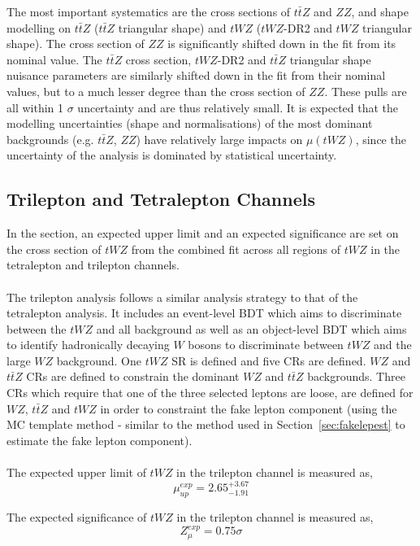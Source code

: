 The most important systematics are the cross sections of $t\bar{t}Z$ and $ZZ$, and shape modelling on $t\bar{t}Z$ ($t\bar{t}Z$ triangular shape) and $tWZ$ ($tWZ$-DR2 and $tWZ$ triangular shape). The cross section of $ZZ$ is significantly shifted down in the fit from its nominal value. The $t\bar{t}Z$ cross section, $tWZ$-DR2 and $t\bar{t}Z$ triangular shape nuisance parameters are similarly shifted down in the fit from their nominal values, but to a much lesser degree than the cross section of $ZZ$. These pulls are all within 1 $\sigma$ uncertainty and are thus relatively small. It is expected that the modelling uncertainties (shape and normalisations) of the most dominant backgrounds (e.g. $t\bar{t}Z$, $ZZ$) have relatively large impacts on $\mu(tWZ)$, since the uncertainty of the analysis is dominated by statistical uncertainty.

\subsection{Trilepton and Tetralepton Channels}
\label{sec:combined-results}
In the section, an expected upper limit and an expected significance are set on the cross section of $tWZ$ from the combined fit across all regions of $tWZ$ in the tetralepton and trilepton channels.\\\\
The trilepton analysis follows a similar analysis strategy to that of the tetralepton analysis. It includes an event-level BDT which aims to discriminate between the $tWZ$ and all background as well as an object-level BDT which aims to identify hadronically decaying $W$ bosons to discriminate between $tWZ$ and the large $WZ$ background. One $tWZ$ SR is defined and five CRs are defined. $WZ$ and $t\bar{t}Z$ CRs are defined to constrain the dominant $WZ$ and $t\bar{t}Z$ backgrounds. Three CRs which require that one of the three selected leptons are loose, are defined for $WZ$, $t\bar{t}Z$ and $tWZ$ in order to constraint the fake lepton component (using the MC template method - similar to the method used in Section~\ref{sec:fakelepest} to estimate the fake lepton component).\\\\
The expected upper limit of $tWZ$ in the trilepton channel is measured as,
\begin{equation}
  \mu_{up}^{exp} =   2.65^{+3.67}_{-1.91}
\end{equation}

The expected significance of $tWZ$ in the trilepton channel is measured as,
\begin{equation}
 Z_{\mu}^{exp} =   0.75\sigma
\end{equation}

